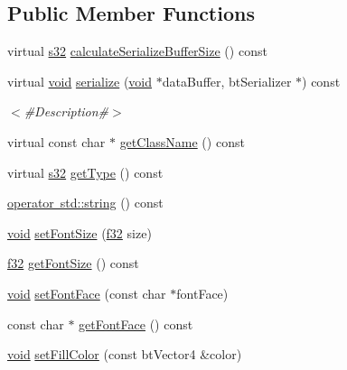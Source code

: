 \subsection*{Public Member Functions}
\begin{DoxyCompactItemize}
\item 
virtual \mbox{\hyperlink{_util_8h_aa62c75d314a0d1f37f79c4b73b2292e2}{s32}} \mbox{\hyperlink{classnjli_1_1_label_h_u_d_a29bae4b017aa0c6b96dc789a633b9778}{calculate\+Serialize\+Buffer\+Size}} () const
\item 
virtual \mbox{\hyperlink{_thread_8h_af1e856da2e658414cb2456cb6f7ebc66}{void}} \mbox{\hyperlink{classnjli_1_1_label_h_u_d_abfd2e24d591c7a69305b30d271b38a77}{serialize}} (\mbox{\hyperlink{_thread_8h_af1e856da2e658414cb2456cb6f7ebc66}{void}} $\ast$data\+Buffer, bt\+Serializer $\ast$) const
\begin{DoxyCompactList}\small\item\em $<$\#\+Description\#$>$ \end{DoxyCompactList}\item 
virtual const char $\ast$ \mbox{\hyperlink{classnjli_1_1_label_h_u_d_aa0887086f1e2ad7f2c33e87b1887e5a7}{get\+Class\+Name}} () const
\item 
virtual \mbox{\hyperlink{_util_8h_aa62c75d314a0d1f37f79c4b73b2292e2}{s32}} \mbox{\hyperlink{classnjli_1_1_label_h_u_d_ae798a4d1d06814724cd18c02b6b64a08}{get\+Type}} () const
\item 
\mbox{\hyperlink{classnjli_1_1_label_h_u_d_a19573cd701b0d0c00523c0e5e9fda63d}{operator std\+::string}} () const
\item 
\mbox{\hyperlink{_thread_8h_af1e856da2e658414cb2456cb6f7ebc66}{void}} \mbox{\hyperlink{classnjli_1_1_label_h_u_d_ac684499e98df76e0554bf882588df45b}{set\+Font\+Size}} (\mbox{\hyperlink{_util_8h_a5f6906312a689f27d70e9d086649d3fd}{f32}} size)
\item 
\mbox{\hyperlink{_util_8h_a5f6906312a689f27d70e9d086649d3fd}{f32}} \mbox{\hyperlink{classnjli_1_1_label_h_u_d_aee2bb7f6202c92a494beb15ff64048b2}{get\+Font\+Size}} () const
\item 
\mbox{\hyperlink{_thread_8h_af1e856da2e658414cb2456cb6f7ebc66}{void}} \mbox{\hyperlink{classnjli_1_1_label_h_u_d_aaa414bebfb2c580b721e9ac8cb5d2284}{set\+Font\+Face}} (const char $\ast$font\+Face)
\item 
const char $\ast$ \mbox{\hyperlink{classnjli_1_1_label_h_u_d_a14780157dcd0ba8aedbdcfe9731f8117}{get\+Font\+Face}} () const
\item 
\mbox{\hyperlink{_thread_8h_af1e856da2e658414cb2456cb6f7ebc66}{void}} \mbox{\hyperlink{classnjli_1_1_label_h_u_d_a3a7058fd10326abad7c3ad61b976dae6}{set\+Fill\+Color}} (const bt\+Vector4 \&color)

\end{DoxyCompactItemize}
